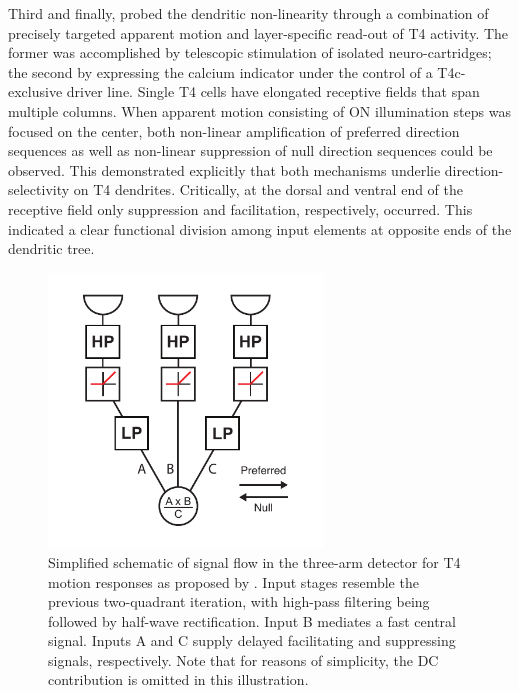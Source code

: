 Third and finally, \citet{Haag:2016cq} probed the dendritic non-linearity through a combination of precisely targeted apparent motion and layer-specific read-out of T4 activity. The former was accomplished by telescopic stimulation of isolated neuro-cartridges; the second by expressing the calcium indicator under the control of a T4c-exclusive driver line. Single T4 cells have elongated receptive fields that span multiple columns. When apparent motion consisting of ON illumination steps was focused on the center, both non-linear amplification of preferred direction sequences as well as non-linear suppression of null direction sequences could be observed. This demonstrated explicitly that both mechanisms underlie direction-selectivity on T4 dendrites. Critically, at the dorsal and ventral end of the receptive field only suppression and facilitation, respectively, occurred. This indicated a clear functional division among input elements at opposite ends of the dendritic tree.

\begin{figure}
    \centering
    \includegraphics[width=0.65\textwidth]{graphics/figure_models2}
    \caption[Combining Reichardt and Barlow-Levick detectors]
    {Simplified schematic of signal flow in the three-arm detector for T4 motion responses as proposed by \citet{Haag:2016cq}. Input stages resemble the previous two-quadrant iteration, with high-pass filtering being followed by half-wave rectification. Input B mediates a fast central signal. Inputs A and C supply delayed facilitating and suppressing signals, respectively. Note that for reasons of simplicity, the DC contribution is omitted in this illustration.}
    \label{fig:detector2}
\end{figure}

